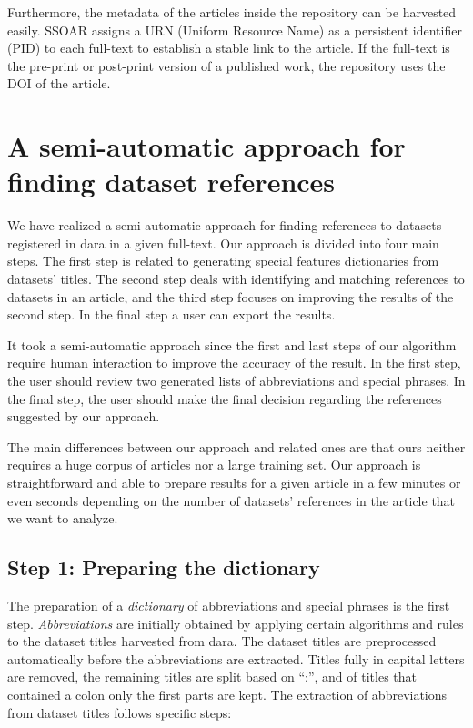 \documentclass{IOS-Book-Article}
\newcommand{\dara}{\textsf{da\textbar ra}}
\begin{document}
Furthermore, the metadata of the articles inside the repository can be harvested easily.
SSOAR assigns a URN (Uniform Resource Name) as a persistent identifier (PID) to each full-text to establish a stable link to the article.
If the full-text is the pre-print or post-print version of a published work, the repository uses the DOI of the article.

\section{A semi-automatic approach for finding dataset references}
\label{sec:approach}
We have realized a semi-automatic approach for finding references to datasets registered in {\dara} in a given full-text. 
Our approach is divided into four main steps.
The first step is related to generating special features dictionaries from datasets' titles.
The second step deals with identifying and matching references to datasets in an article, and the third step focuses on improving the results of the second step.
In the final step a user can export the results.

It took a semi-automatic approach since 
the first and last steps of our algorithm require human interaction to improve the accuracy of the result. 
In the first step, the user should review two generated lists of abbreviations and special phrases.
In the final step, the user should make the final decision regarding the references suggested by our approach.

The main differences between our approach and related ones are that ours neither requires a huge corpus of articles nor a large training set.
Our approach is straightforward and able to prepare results for a given article in a few minutes or even seconds depending on the number of datasets' references in the article that we want to analyze.

\subsection{Step 1: Preparing the dictionary}
\label{sec:preparing-dictionary}
The preparation of a \emph{dictionary} of abbreviations and special phrases is the first step.
\emph{Abbreviations} are initially obtained by applying certain algorithms and rules to the dataset titles harvested from {\dara}.
The dataset titles are preprocessed automatically before the abbreviations are extracted.
Titles fully in capital letters are removed, the remaining titles are split based on \enquote{:}, and of titles that contained a colon only the first parts are kept.
The extraction of abbreviations from dataset titles follows specific steps:
\end{document}
